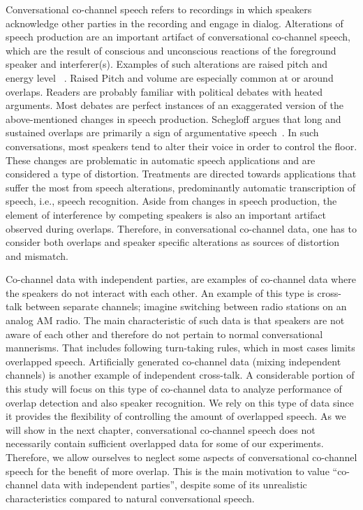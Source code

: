 Conversational co-channel speech refers to recordings in which speakers acknowledge other parties in the recording and engage in dialog. 
Alterations of speech production are an important artifact of conversational co-channel speech, which are the result of conscious and unconscious reactions of the foreground speaker and interferer(s). 
Examples of such alterations are raised pitch and energy level ~\cite{Shriberg01observationson,schegloff2000overlapping}. 
Raised Pitch and volume are especially common at or around overlaps. 
Readers are probably familiar with political debates with heated arguments. 
Most debates are perfect instances of an exaggerated version of the above-mentioned changes in speech production. 
Schegloff argues that long and sustained overlaps are primarily a sign of argumentative speech~\cite{schegloff2000overlapping}. 
In such conversations, most speakers tend to alter their voice in order to control the floor. 
These changes are problematic in automatic speech applications and are considered a type of distortion. 
Treatments are directed towards applications that suffer the most from speech alterations, predominantly automatic transcription of speech, i.e., speech recognition. 
Aside from changes in speech production, the element of interference by competing speakers is also an important artifact observed during overlaps. 
Therefore, in conversational co-channel data, one has to consider both overlaps and speaker specific alterations as sources of distortion and mismatch. 

Co-channel data with independent parties, are examples of co-channel data where the speakers do not interact with each other. 
An example of this type is cross-talk between separate channels; imagine switching between radio stations on an analog AM radio. 
The main characteristic of such data is that speakers are not aware of each other and therefore do not pertain to normal conversational mannerisms. 
That includes following turn-taking rules, which in most cases limits overlapped speech. 
Artificially generated co-channel data (mixing independent channels) is another example of independent cross-talk. 
A considerable portion of this study will focus on this type of co-channel data to analyze performance of overlap detection and also speaker recognition. 
We rely on this type of data since it provides the flexibility of controlling the amount of overlapped speech. 
As we will show in the next chapter, conversational co-channel speech does not necessarily contain sufficient overlapped data for some of our experiments. 
Therefore, we allow ourselves to neglect some aspects of conversational co-channel speech for the benefit of more overlap. 
This is the main motivation to value ``co-channel data with independent parties'', despite some of its unrealistic characteristics compared to natural conversational speech. 

